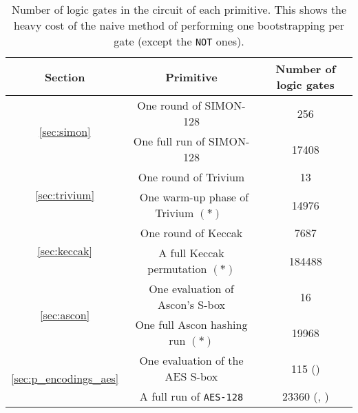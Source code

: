 \begin{table}
    \centering
    \begin{tabular}{|c|c|c|}
        \hline
        \textbf{Section} & \textbf{Primitive} & \textbf{Number of logic gates}  \\
        \hline
        \multirow{2}{*}{\ref{sec:simon}} & One round of SIMON-128 & 256\\
        \cline{2-3}
        & One full run of SIMON-128 & 17408\\
        \hline
        \multirow{2}{*}{\ref{sec:trivium}} & One round of Trivium & 13\\
        \cline{2-3}
        & ~One warm-up phase of Trivium $(*)$~ & 14976\\
        \hline
        \multirow{2}{*}{\ref{sec:keccak}} & One round of Keccak & 7687\\
        \cline{2-3}
        & A full Keccak permutation $(*)$ & 184488\\
        \hline
      \multirow{2}{*}{ \ref{sec:ascon}} & One evaluation of Ascon's \gls{S-box} & 16\\
      \cline{2-3}
      & One full Ascon hashing run $(*)$ & 19968\\
        \hline
        \multirow{2}{*}{\ref{sec:p_encodings_aes}} & One evaluation of the \gls{AES} \gls{S-box} & 115 (\cite{boyar})\\
        \cline{2-3}
        & A full run of \texttt{\gls{AES}-128}  & 23360 (\cite{boyar}, \cite{EPRINT:Maximov19})\\
        \hline
    \end{tabular}
    \medskip
    \caption{Number of logic gates in the circuit of each primitive. This shows the heavy cost of the naive method of performing one bootstrapping per gate (except the \texttt{NOT} ones).}
    \label{tab:gates}
\end{table}


